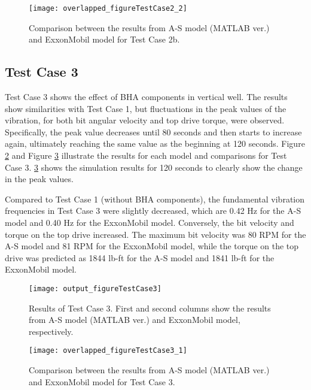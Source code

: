 \begin{figure}
  \centering
  \texttt{[image: overlapped\_figureTestCase2\_2]}
  \caption[Comparison of the results for Test Case 2b]{Comparison between the results from A-S model (MATLAB ver.) and ExxonMobil model for Test Case 2b.}\label{figure_testcase2_2_overlapped}
\end{figure}

\subsection{Test Case 3}
Test Case 3 shows the effect of BHA components in vertical well. The results show similarities with Test Case 1, but fluctuations in the peak values of the vibration, for both bit angular velocity and top drive torque, were observed. Specifically, the peak value decreases until 80 seconds and then starts to increase again, ultimately reaching the same value as the beginning at 120 seconds. Figure \ref{figure_testcase3} and Figure \ref{figure_testcase3_overlapped} illustrate the results for each model and comparisons for Test Case 3. \ref{figure_testcase3_overlapped} shows the simulation results for 120 seconds to clearly show the change in the peak values.

Compared to Test Case 1 (without BHA components), the fundamental vibration frequencies in Test Case 3 were slightly decreased, which are 0.42 Hz for the A-S model and 0.40 Hz for the ExxonMobil model. Conversely, the bit velocity and torque on the top drive increased. The maximum bit velocity was 80 RPM for the A-S model and 81 RPM for the ExxonMobil model, while the torque on the top drive was predicted as 1844 lb-ft for the A-S model and 1841 lb-ft for the ExxonMobil model. 

\begin{figure}
  \centering
  \texttt{[image: output\_figureTestCase3]}
  \caption[Results of Test Case 3]{Results of Test Case 3. First and second columns show the results from A-S model (MATLAB ver.) and ExxonMobil model, respectively.}\label{figure_testcase3}
\end{figure}
\begin{figure}
  \centering
  \texttt{[image: overlapped\_figureTestCase3\_1]}
  \caption[Comparison of the results for Test Case 3]{Comparison between the results from A-S model (MATLAB ver.) and ExxonMobil model for Test Case 3.}\label{figure_testcase3_overlapped}
\end{figure}

